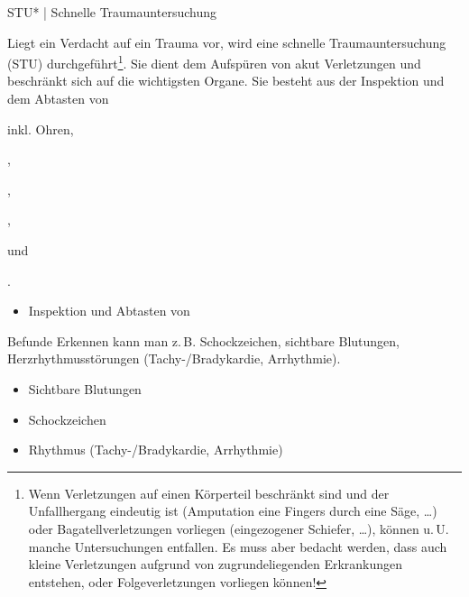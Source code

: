 {{STU}* | Schnelle Traumauntersuchung}
{
Liegt ein Verdacht auf ein Trauma
vor, wird eine schnelle Traumauntersuchung (STU)
durchgeführt\footnote{Wenn Verletzungen auf einen 
Körperteil beschränkt sind und
der Unfallhergang eindeutig ist (Amputation eine Fingers
durch eine Säge, \ldots) oder Bagatellverletzungen vorliegen
(eingezogener Schiefer, \ldots), können u.\,U. manche
Untersuchungen entfallen. Es muss aber bedacht werden, dass
auch kleine Verletzungen aufgrund von zugrundeliegenden
Erkrankungen entstehen, oder Folgeverletzungen vorliegen
können!}. 
Sie dient dem Aufspüren von akut
 Verletzungen und beschränkt sich auf
die wichtigsten Organe. Sie besteht aus der  Inspektion
  und dem Abtasten von
  \begin{compactenum}
    \item {} inkl. Ohren,
    \item {},
    \item {},
    \item {},
    \item {} und
    \item {}.
  \end{compactenum}
}
{\begin{itemize}
  \item Inspektion
  und Abtasten von
\end{itemize}}
{}
{}
{}




{{\eye} Befunde}
{Erkennen kann man z.\,B. Schockzeichen,
sichtbare Blutungen, Herzrhythmusstörungen (Tachy-/Bradykardie,
Arrhythmie).
}
{\begin{itemize}
  \item[\eye] Sichtbare Blutungen
  \item[\eye] Schockzeichen
  \item[\eye] Rhythmus (Tachy-/Bradykardie, Arrhythmie)
\end{itemize}
}
{}
{}
{}


